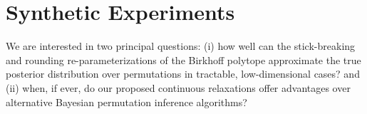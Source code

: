 \documentclass[twoside]{article}
\DeclareRobustCommand{\parhead}[1]{\textbf{#1}~}
\begin{document}

\section{Synthetic Experiments}
\label{sec:synthetic}
We are interested in two principal questions: 
 (i) how well can the stick-breaking and rounding re-parameterizations
of the Birkhoff polytope approximate the true posterior distribution
over permutations in tractable, low-dimensional cases? and (ii)
when, if ever, do our proposed continuous relaxations offer
advantages over alternative  Bayesian permutation
inference algorithms?
\end{document}
